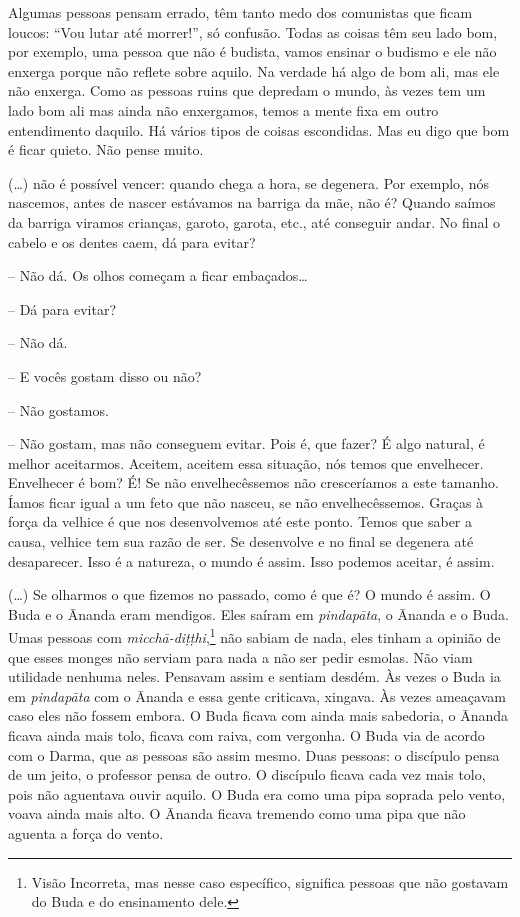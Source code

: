 Algumas pessoas pensam errado, têm tanto medo dos comunistas que
ficam loucos: “Vou lutar até morrer!”, só confusão. Todas as coisas têm
seu lado bom, por exemplo, uma pessoa que não é budista, vamos ensinar
o budismo e ele não enxerga porque não reflete sobre aquilo. Na verdade
há algo de bom ali, mas ele não enxerga. Como as pessoas ruins que
depredam o mundo, às vezes tem um lado bom ali mas ainda não
enxergamos, temos a mente fixa em outro entendimento daquilo. Há vários
tipos de coisas escondidas. Mas eu digo que bom é ficar quieto. Não
pense muito.

(…) não é possível vencer: quando chega a hora, se degenera. Por
exemplo, nós nascemos, antes de nascer estávamos na barriga da mãe, não
é? Quando saímos da barriga viramos crianças, garoto, garota, etc., até
conseguir andar. No final o cabelo e os dentes caem, dá para evitar?

-- Não dá. Os olhos começam a ficar embaçados…

-- Dá para evitar?

-- Não dá.

-- E vocês gostam disso ou não?

-- Não gostamos.

-- Não gostam, mas não conseguem evitar. Pois é, que fazer? É algo
natural, é melhor aceitarmos. Aceitem, aceitem essa situação, nós temos
que envelhecer. Envelhecer é bom? É! Se não envelhecêssemos não
cresceríamos a este tamanho. Íamos ficar igual a um feto que não
nasceu, se não envelhecêssemos. Graças à força da velhice é que nos
desenvolvemos até este ponto. Temos que saber a causa, velhice tem sua
razão de ser. Se desenvolve e no final se degenera até desaparecer.
Isso é a natureza, o mundo é assim. Isso podemos aceitar, é assim.

(…) Se olharmos o que fizemos no passado, como é que é? O mundo é
assim. O Buda e o Ānanda eram mendigos. Eles saíram em
\textit{pindapāta}, o Ānanda e o Buda. Umas pessoas com
\textit{micchā-diṭṭhi},\footnote{Visão Incorreta, mas nesse caso
específico, significa pessoas que não gostavam do Buda e do ensinamento
dele.} não sabiam de nada, eles tinham a opinião de que esses
monges não serviam para nada a não ser pedir esmolas. Não viam
utilidade nenhuma neles. Pensavam assim e sentiam desdém. Às vezes o
Buda ia em \textit{pindapāta} com o Ānanda e essa gente criticava,
xingava. Às vezes ameaçavam caso eles não fossem embora. O Buda ficava
com ainda mais sabedoria, o Ānanda ficava ainda mais tolo, ficava com
raiva, com vergonha. O Buda via de acordo com o Darma, que as pessoas
são assim mesmo. Duas pessoas: o discípulo pensa de um jeito, o
professor pensa de outro. O discípulo ficava cada vez mais tolo, pois
não aguentava ouvir aquilo. O Buda era como uma pipa soprada pelo
vento, voava ainda mais alto. O Ānanda ficava tremendo como uma pipa
que não aguenta a força do vento.

